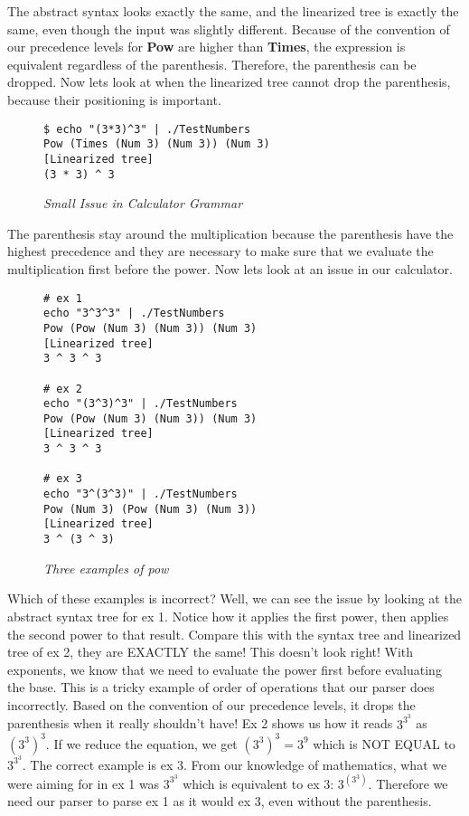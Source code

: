 \documentclass{article}
\begin{document}
The abstract syntax looks exactly the same, and the linearized tree is exactly the same, even though the input was slightly different. Because of the convention of our precedence levels for \textbf{Pow} are higher than \textbf{Times}, the expression is equivalent regardless of the parenthesis. Therefore, the parenthesis can be dropped. Now lets look at when the linearized tree cannot drop the parenthesis, because their positioning is important.

\begin{figure}[H]
    \begin{lstlisting}
$ echo "(3*3)^3" | ./TestNumbers 
Pow (Times (Num 3) (Num 3)) (Num 3)
[Linearized tree]
(3 * 3) ^ 3
    \end{lstlisting}
    \caption{\textit{Small Issue in Calculator Grammar}}
\end{figure}

The parenthesis stay around the multiplication because the parenthesis have the highest precedence and they are necessary to make sure that we evaluate the multiplication first before the power. Now lets look at an issue in our calculator.

\begin{figure}[H]
    \begin{lstlisting}
# ex 1
echo "3^3^3" | ./TestNumbers 
Pow (Pow (Num 3) (Num 3)) (Num 3)
[Linearized tree]
3 ^ 3 ^ 3

# ex 2
echo "(3^3)^3" | ./TestNumbers 
Pow (Pow (Num 3) (Num 3)) (Num 3)
[Linearized tree]
3 ^ 3 ^ 3

# ex 3
echo "3^(3^3)" | ./TestNumbers 
Pow (Num 3) (Pow (Num 3) (Num 3))
[Linearized tree]
3 ^ (3 ^ 3)
    \end{lstlisting}
    \caption{\textit{Three examples of pow}}
\end{figure}

Which of these examples is incorrect? Well, we can see the issue by looking at the abstract syntax tree for ex 1. Notice how it applies the first power, then applies the second power to that result. Compare this with the syntax tree and linearized tree of ex 2, they are EXACTLY the same! This doesn't look right! With exponents, we know that we need to evaluate the power first before evaluating the base. This is a tricky example of order of operations that our parser does incorrectly. Based on the convention of our precedence levels, it drops the parenthesis when it really shouldn't have! Ex 2 shows us how it reads $3^{3^3}$ as $(3^3)^3$. If we reduce the equation, we get $(3^3)^3 = 3 ^9$ which is NOT EQUAL to $3^{3^3}$. The correct example is ex 3. From our knowledge of mathematics, what we were aiming for in ex 1 was $3^{3^3}$ which is equivalent to ex 3:  $3^{(3^3)}$. Therefore we need our parser to parse ex 1 as it would ex 3, even without the parenthesis. 
\end{document}
